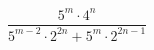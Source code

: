 \begin{ex}[type=expression]
	\begin{condition}
		\( \dfrac{5^m\cdot4^n}{5^{m-2}\cdot2^{2n}+5^m\cdot2^{2n-1}} \)
	\end{condition}
\end{ex}